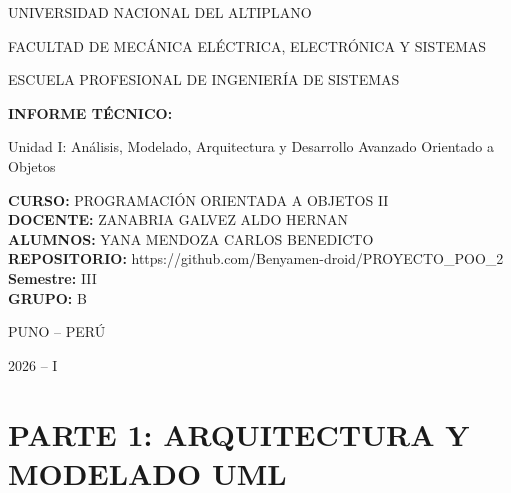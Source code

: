\documentclass[12pt,a4paper]{article}
\begin{document}
\begin{titlepage}
    \centering
    {\scshape\LARGE UNIVERSIDAD NACIONAL DEL ALTIPLANO\par}
    \vspace{0.5cm}
    {\scshape\Large FACULTAD DE MECÁNICA ELÉCTRICA, ELECTRÓNICA Y SISTEMAS\par}
    \vspace{0.3cm}
    {\scshape\large ESCUELA PROFESIONAL DE INGENIERÍA DE SISTEMAS\par}
    \vspace{5cm}

    {\huge\bfseries INFORME TÉCNICO:\par}
    \vspace{0.5cm}
    {\Large Unidad I: Análisis, Modelado, Arquitectura y Desarrollo Avanzado Orientado a Objetos\par}
    \vspace{4cm}

    \begin{flushleft}
    \textbf{CURSO:} PROGRAMACIÓN ORIENTADA A OBJETOS II\\
    \vspace{0.5cm}
    \textbf{DOCENTE:} ZANABRIA GALVEZ ALDO HERNAN\\
    \vspace{0.5cm}
    \textbf{ALUMNOS:} YANA MENDOZA CARLOS BENEDICTO\\
    \vspace{0.5cm}
    \textbf{REPOSITORIO:} https://github.com/Benyamen-droid/PROYECTO_POO_2\\
    \vspace{0.5cm}
    \textbf{Semestre:} III\\
    \vspace{0.5cm}
    \textbf{GRUPO:} B
    \vspace{0.5cm}
    \end{flushleft}

    \vfill
    {\large PUNO – PERÚ\par}
    {\large 2026 – I\par}
\end{titlepage}

\tableofcontents
\newpage

\section{PARTE 1: ARQUITECTURA Y MODELADO UML}
\end{document}
